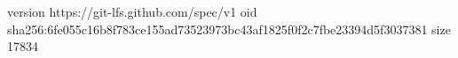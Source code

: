 version https://git-lfs.github.com/spec/v1
oid sha256:6fe055c16b8f783ce155ad73523973bc43af1825f0f2c7fbe23394d5f3037381
size 17834
